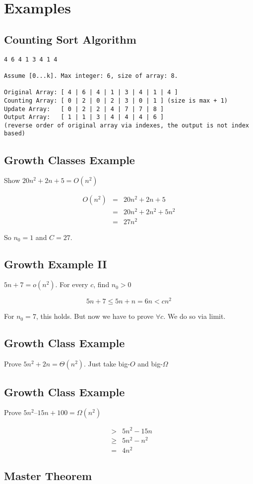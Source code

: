 \documentclass{article}
\begin{document}
\setcounter{section}{8}
\section{Examples}

\subsection{Counting Sort Algorithm}
\begin{verbatim}
4 6 4 1 3 4 1 4

Assume [0...k]. Max integer: 6, size of array: 8.

Original Array: [ 4 | 6 | 4 | 1 | 3 | 4 | 1 | 4 ]
Counting Array: [ 0 | 2 | 0 | 2 | 3 | 0 | 1 ] (size is max + 1)
Update Array:   [ 0 | 2 | 2 | 4 | 7 | 7 | 8 ]
Output Array:   [ 1 | 1 | 3 | 4 | 4 | 4 | 6 ]
(reverse order of original array via indexes, the output is not index based)

\end{verbatim}

\subsection{Growth Classes Example}
Show $20n^2 + 2n + 5  = O(n^2)$

\begin{eqnarray}
O(n^2) & = & 20n^2 + 2n + 5 \\
& = & 20n^2 + 2n^2 + 5n^2 \\
& = & 27n^2
\end{eqnarray}

So $n_0 = 1$ and $C = 27$.

\subsection{Growth Example II}
$5n+7 = o(n^2)$. For every $c$, find $n_0 > 0$

\begin{equation}
5n+7 \leq 5n + n = 6n < cn^2
\end{equation}

For $n_0 = 7$, this holds. But now we have to prove $\forall c$. We do so via limit.

\subsection{Growth Class Example}
Prove $5n^2 + 2n =  \Theta(n^2)$. Just take big-$O$ and big-$\Omega$

\subsection{Growth Class Example}
Prove $5n^2 – 15n + 100 = \Omega(n^2)$

\begin{eqnarray}
& > & 5n^2 - 15n \\
& \geq & 5n^2 - n^2 \\
& = & 4n^2
\end{eqnarray}

\subsection{Master Theorem}
\end{document}
